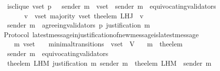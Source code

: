 \begin{isabellebody}
\ \ {\isasymlongrightarrow}\ is{\isacharunderscore}clique\ {\isacharparenleft}v{\isacharunderscore}set{\isacharcomma}\ p{\isacharcomma}\ {\isasymsigma}{\isacharparenright}\ {\isasymand}\ sender\ m{\isacharprime}\ {\isasymin}\ v{\isacharunderscore}set\ {\isasymand}\ sender\ m{\isacharprime}\ {\isasymnotin}\ equivocating{\isacharunderscore}validators\ {\isasymsigma}{\isacharprime}\isanewline
\ \ \ \ \ \ {\isasymand}\ {\isacharparenleft}{\isasymforall}\ v\ {\isasymin}\ v{\isacharunderscore}set{\isachardot}\ majority\ {\isacharparenleft}v{\isacharunderscore}set{\isacharcomma}\ the{\isacharunderscore}elem\ {\isacharparenleft}L{\isacharunderscore}H{\isacharunderscore}J\ {\isasymsigma}\ v{\isacharparenright}{\isacharparenright}{\isacharparenright}\ \isanewline
\ \ {\isasymlongrightarrow}\ sender\ m{\isacharprime}\ {\isasymin}\ agreeing{\isacharunderscore}validators\ {\isacharparenleft}p{\isacharcomma}\ justification\ m{\isacharprime}{\isacharparenright}{\isachardoublequoteclose}\isanewline
%
\isadelimproof
\ \ %
\endisadelimproof
%
\isatagproof
{}\isamarkupfalse%
%
\endisatagproof
{\isafoldproof}%
%
\isadelimproof
\isanewline
%
\endisadelimproof
\isanewline
\isanewline
\isanewline
\isanewline
{}\isamarkupfalse%
\ {\isacharparenleft}\ Protocol{\isacharparenright}\ latest{\isacharunderscore}message{\isacharunderscore}in{\isacharunderscore}justification{\isacharunderscore}of{\isacharunderscore}new{\isacharunderscore}message{\isacharunderscore}is{\isacharunderscore}latest{\isacharunderscore}message\ {\isacharcolon}\isanewline
\ \ {\isachardoublequoteopen}{\isasymforall}\ {\isasymsigma}\ {\isasymsigma}{\isacharprime}\ m{\isacharprime}\ v{\isacharunderscore}set{\isachardot}\ {\isacharparenleft}{\isasymsigma}{\isacharcomma}\ {\isasymsigma}{\isacharprime}{\isacharparenright}\ {\isasymin}\ minimal{\isacharunderscore}transitions\ {\isasymand}\ v{\isacharunderscore}set\ {\isasymsubseteq}\ V\isanewline
\ \ {\isasymlongrightarrow}\ m{\isacharprime}\ {\isacharequal}\ the{\isacharunderscore}elem\ {\isacharparenleft}{\isasymsigma}{\isacharprime}\ {\isacharminus}\ {\isasymsigma}{\isacharparenright}\isanewline
\ \ {\isasymlongrightarrow}\ sender\ m{\isacharprime}\ {\isasymnotin}\ equivocating{\isacharunderscore}validators\ {\isasymsigma}{\isacharprime}\isanewline
\ \ {\isasymlongrightarrow}\ the{\isacharunderscore}elem\ {\isacharparenleft}L{\isacharunderscore}H{\isacharunderscore}M\ {\isacharparenleft}justification\ m{\isacharprime}{\isacharparenright}\ {\isacharparenleft}sender\ m{\isacharprime}{\isacharparenright}{\isacharparenright}\ {\isacharequal}\ the{\isacharunderscore}elem\ {\isacharparenleft}L{\isacharunderscore}H{\isacharunderscore}M\ {\isasymsigma}\ {\isacharparenleft}sender\ m{\isacharprime}{\isacharparenright}{\isacharparenright}{\isachardoublequoteclose}\isanewline

\end{isabellebody}
